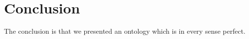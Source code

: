 \section{Conclusion}
\label{sec:conclusion}

\color{red}
The conclusion is that we presented an ontology which is in every sense perfect.

\color{black}
